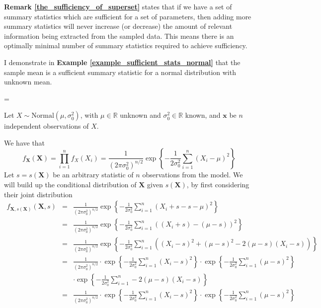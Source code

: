 \documentclass[bibliography=totoc,11pt,a4paper,margin=0]{article}
\theoremstyle{break}
\begin{document}
  \par \textbf{Remark \ref{the_sufficiency_of_superset}} states that if we have a set of summary statistics which are sufficient for a set of parameters, then adding more summary statistics will never increase (or decrease) the amount of relevant information being extracted from the sampled data. This means there is an optimally minimal number of summary statistics required to achieve sufficiency.

  \par I demonstrate in \textbf{Example \ref{example_sufficient_stats_normal}} that the sample mean is a sufficient summary statistic for a normal distribution with unknown mean.

  \begin{box_example}\label{example_sufficient_stats_normal}
    \everymath={\displaystyle}
    \par\par Let $X\sim\text{Normal}(\mu,\sigma^2_0)$, with $\mu\in\mathbb{R}$ unknown and $\sigma_0^2\in\mathbb{R}$ known, and $\mathbf{x}$ be $n$ independent observations of $X$.
    \par We have that
    \[
      f_{\mathbf{X}}(\mathbf{X})=\prod_{i=1}^nf_X(X_i)=\frac1{(2\pi\sigma_0^2)^{n/2}}\exp\left\{-\frac1{2\sigma_0^2}\sum_{i=1}^n(X_i-\mu)^2\right\}
    \]
    Let $s=s(\mathbf{X})$ be an arbitrary statistic of $n$ observations from the model. We will build up the conditional distribution of $\mathbf{X}$ given $s(\mathbf{X})$, by first considering their joint distribution
    \[\begin{array}{rcl}
      f_{\mathbf{X},s(\mathbf{X})}(\mathbf{X},s)&=&\frac1{(2\pi\sigma_0^2)^{n/2}}\exp\left\{-\frac1{2\sigma_0^2}\sum_{i=1}^n(X_i+s-s-\mu)^2\right\}\\
      &=&\frac1{(2\pi\sigma_0^2)^{n/2}}\exp\left\{-\frac1{2\sigma_0^2}\sum_{i=1}^n((X_i+s)-(\mu-s))^2\right\}\\
      &=&\frac1{(2\pi\sigma_0^2)^{n/2}}\exp\left\{-\frac1{2\sigma_0^2}\sum_{i=1}^n\left((X_i-s)^2+(\mu-s)^2-2(\mu-s)(X_i-s)\right)\right\}\\
      &=&\frac1{(2\pi\sigma_0^2)^{n/2}}\cdot\exp\left\{-\frac1{2\sigma_0^2}\sum_{i=1}^n(X_i-s)^2\right\}\cdot\exp\left\{-\frac1{2\sigma_0^2}\sum_{i=1}^n(\mu-s)^2\right\}\\
      &&\cdot\exp\left\{-\frac1{2\sigma_0^2}\sum_{i=1}^n-2(\mu-s)(X_i-s)\right\}\\
      &=&\frac1{(2\pi\sigma_0^2)^{n/2}}\cdot\exp\left\{-\frac1{2\sigma_0^2}\sum_{i=1}^n(X_i-s)^2\right\}\cdot\exp\left\{-\frac1{2\sigma_0^2}\sum_{i=1}^n(\mu-s)^2\right\}\\

\end{array}\]
\end{box_example}
\end{document}
